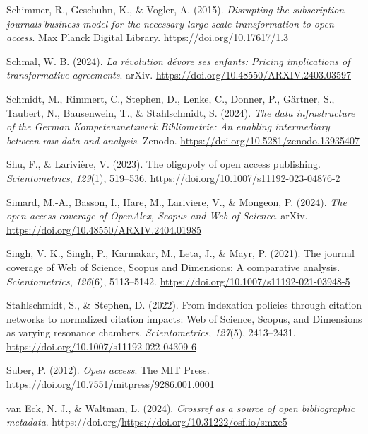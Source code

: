 \documentclass[a4paper,man,floatsintext,longtable,noextraspace,10pt]{apa6}
\newlength{\cslhangindent}
\newenvironment{CSLReferences}[2] %
{\begin{list}{}{%
  \setlength{\itemindent}{0pt}
  \setlength{\leftmargin}{0pt}
  \setlength{\parsep}{0pt}
  \ifodd #1
  \setlength{\leftmargin}{\cslhangindent}
  \setlength{\itemindent}{-1\cslhangindent}
  \fi
  \setlength{\itemsep}{#2\baselineskip}}}
{\end{list}}
\begin{document}
\begin{CSLReferences}{1}{0}
Schimmer, R., Geschuhn, K., \& Vogler, A. (2015). \emph{{Disrupting the
subscription journals'business model for the necessary large-scale
transformation to open access}}. Max Planck Digital Library.
\url{https://doi.org/10.17617/1.3}

Schmal, W. B. (2024). \emph{La révolution dévore ses enfants: Pricing
implications of transformative agreements}. arXiv.
\url{https://doi.org/10.48550/ARXIV.2403.03597}

Schmidt, M., Rimmert, C., Stephen, D., Lenke, C., Donner, P., Gärtner,
S., Taubert, N., Bausenwein, T., \& Stahlschmidt, S. (2024). \emph{The
data infrastructure of the {German Kompetenznetzwerk Bibliometrie}: An
enabling intermediary between raw data and analysis}. Zenodo.
\url{https://doi.org/10.5281/zenodo.13935407}

Shu, F., \& Larivière, V. (2023). The oligopoly of open access
publishing. \emph{Scientometrics}, \emph{129}(1), 519--536.
\url{https://doi.org/10.1007/s11192-023-04876-2}

Simard, M.-A., Basson, I., Hare, M., Lariviere, V., \& Mongeon, P.
(2024). \emph{The open access coverage of {OpenAlex}, {Scopus} and {Web
of Science}}. arXiv. \url{https://doi.org/10.48550/ARXIV.2404.01985}

Singh, V. K., Singh, P., Karmakar, M., Leta, J., \& Mayr, P. (2021). The
journal coverage of {Web of Science}, {Scopus} and {Dimensions}: A
comparative analysis. \emph{Scientometrics}, \emph{126}(6), 5113--5142.
\url{https://doi.org/10.1007/s11192-021-03948-5}

Stahlschmidt, S., \& Stephen, D. (2022). From indexation policies
through citation networks to normalized citation impacts: {Web of
Science}, {Scopus}, and {Dimensions} as varying resonance chambers.
\emph{Scientometrics}, \emph{127}(5), 2413--2431.
\url{https://doi.org/10.1007/s11192-022-04309-6}

Suber, P. (2012). \emph{Open access}. The MIT Press.
\url{https://doi.org/10.7551/mitpress/9286.001.0001}

van Eck, N. J., \& Waltman, L. (2024). \emph{Crossref as a source of
open bibliographic metadata}.
https://doi.org/\url{https://doi.org/10.31222/osf.io/smxe5}


\end{CSLReferences}
\end{document}
